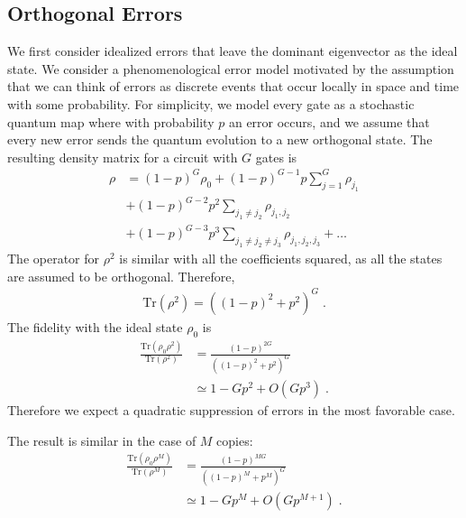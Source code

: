 \documentclass[
amsmath,
amssymb,
aps,
pra,
reprint,
twocolumn,
superscriptaddress,
longbibliography,
showkeys,
floatfix
]{revtex4-1}
\def\tr{\mathrm{Tr}}
\begin{document}
\subsection{Orthogonal Errors}
\label{sec:orthogonal_errors}
We first consider idealized errors that leave the dominant eigenvector as the
ideal state.
We consider a phenomenological error model motivated by the assumption that we
can think of errors as discrete events that occur locally in space and time with
some probability. 
For simplicity, we model every gate as a stochastic quantum map where with
probability $p$ an error occurs, and we assume that every new error sends the
quantum evolution to a new orthogonal state. 
The resulting density matrix for a circuit with $G$ gates is
\begin{align}
\rho &= (1-p)^G\rho_0 + (1-p)^{G-1}p \sum_{j=1}^G \rho_{j_1} \nonumber \\
&+ (1-p)^{G-2}p^2\sum_{j_1 \ne j_2} \rho_{j_1,j_2}\nonumber \\
&+ (1-p)^{G-3}p^3\sum_{j_1 \ne j_2 \ne j_3} \rho_{j_1,j_2,j_3} + \ldots
\end{align}
The operator for $\rho^2$ is similar with all the coefficients squared, as all
the states are assumed to be orthogonal. 
Therefore,
\begin{align}
    \tr(\rho^2) = ((1-p)^2 + p^2)^G\;.
\end{align}
The fidelity with the ideal state $\rho_0$ is 
\begin{align}
    \frac{\tr( \rho_0 \rho^2 )}{\tr( \rho^2 )} &= \frac{(1-p)^{2 G}}{((1-p)^2 + p^2)^G} \\
    &\simeq 1 - G p^2 + O( G p^3 )\;.
\end{align}
Therefore we expect a quadratic suppression of errors in the most favorable case. 

The result is similar in the case of $M$ copies:
\begin{align}
    \frac{\tr( \rho_0 \rho^M )}{\tr( \rho^M )} &= \frac{(1-p)^{M G}}{((1-p)^M + p^M)^G} \\
&\simeq 1 - G p^M + O( Gp^{M+1} )\;.
\end{align}
\end{document}
